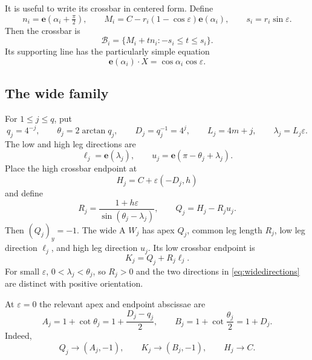\documentclass[11pt]{amsart}
\theoremstyle{definition}
\newcommand{\evec}{\mathbf e}
\newcommand{\B}{\mathcal B}
\newcommand{\eps}{\varepsilon}
\begin{document}
It is useful to write its crossbar in centered form.  Define
\[
 n_i=\evec(\alpha_i+\tfrac\pi2),\qquad
 M_i=C-r_i(1-\cos\eps)\evec(\alpha_i),\qquad
 s_i=r_i\sin\eps.
\]
Then the crossbar is
\begin{equation}\label{eq:narrowbar}
 \B_i=\{M_i+t n_i:-s_i\le t\le s_i\}.
\end{equation}
Its supporting line has the particularly simple equation
\begin{equation}\label{eq:narrowbarline}
 \evec(\alpha_i)\mathbin\cdot X=\cos\alpha_i\cos\eps.
\end{equation}

\subsection{The wide family}

For $1\le j\le q$, put
\begin{equation}\label{eq:wideparameters}
 q_j=4^{-j},\qquad
 \theta_j=2\arctan q_j,\qquad
 D_j=q_j^{-1}=4^j,
 \qquad L_j=4m+j,
 \qquad \lambda_j=L_j\eps.
\end{equation}
The low and high leg directions are
\begin{equation}\label{eq:widedirections}
 \ell_j=\evec(\lambda_j),
 \qquad
 u_j=\evec(\pi-\theta_j+\lambda_j).
\end{equation}
Place the high crossbar endpoint at
\[
 H_j=C+\eps(-D_j,h)
\]
and define
\begin{equation}\label{eq:wideradius}
 R_j=\frac{1+h\eps}{\sin(\theta_j-\lambda_j)},
 \qquad
 Q_j=H_j-R_j u_j.
\end{equation}
Then $(Q_j)_y=-1$.  The wide A $W_j$ has apex $Q_j$, common leg length
$R_j$, low leg direction $\ell_j$, and high leg direction $u_j$.  Its low
crossbar endpoint is
\[
 K_j=Q_j+R_j\ell_j.
\]
For small $\eps$, $0<\lambda_j<\theta_j$, so $R_j>0$ and the two directions
in \eqref{eq:widedirections} are distinct with positive orientation.

At $\eps=0$ the relevant apex and endpoint abscissae are
\begin{equation}\label{eq:AB}
 A_j=1+\cot\theta_j
     =1+\frac{D_j-q_j}{2},
 \qquad
 B_j=1+\cot\frac{\theta_j}{2}=1+D_j.
\end{equation}
Indeed,
\begin{equation}\label{eq:widelimits}
 Q_j\longrightarrow(A_j,-1),\qquad
 K_j\longrightarrow(B_j,-1),\qquad
 H_j\longrightarrow C.
\end{equation}
\end{document}
